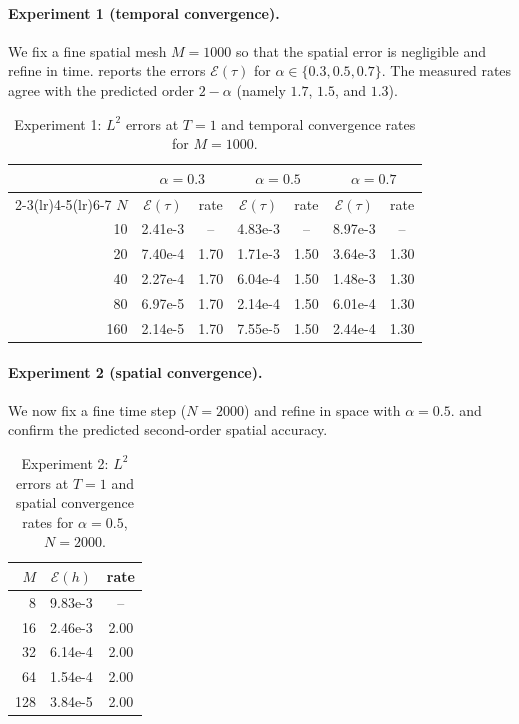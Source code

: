 \documentclass[11pt]{ajam}
\begin{document}
\paragraph{Experiment 1 (temporal convergence).}
We fix a fine spatial mesh $M=1000$ so that the spatial error is negligible
and refine in time.  reports the errors $\mathcal{E}(\tau)$
for $\alpha\in\{0.3,0.5,0.7\}$. The measured rates agree with the predicted
order $2-\alpha$ (namely $1.7$, $1.5$, and $1.3$).

\begin{table}[t]
  \centering
  \caption{Experiment 1: $L^2$ errors at $T=1$ and temporal convergence
           rates for $M=1000$.}
  \label{tab:time}
  \small
  \begin{tabular}{@{}r cc cc cc@{}}
    \toprule
    & \multicolumn{2}{c}{$\alpha=0.3$}
    & \multicolumn{2}{c}{$\alpha=0.5$}
    & \multicolumn{2}{c}{$\alpha=0.7$}\\
    \cmidrule(lr){2-3}\cmidrule(lr){4-5}\cmidrule(lr){6-7}
    $N$ & $\mathcal{E}(\tau)$ & rate
        & $\mathcal{E}(\tau)$ & rate
        & $\mathcal{E}(\tau)$ & rate \\
    \midrule
    10  & 2.41e-3 & --   & 4.83e-3 & --   & 8.97e-3 & --   \\
    20  & 7.40e-4 & 1.70 & 1.71e-3 & 1.50 & 3.64e-3 & 1.30 \\
    40  & 2.27e-4 & 1.70 & 6.04e-4 & 1.50 & 1.48e-3 & 1.30 \\
    80  & 6.97e-5 & 1.70 & 2.14e-4 & 1.50 & 6.01e-4 & 1.30 \\
    160 & 2.14e-5 & 1.70 & 7.55e-5 & 1.50 & 2.44e-4 & 1.30 \\
    \bottomrule
  \end{tabular}
\end{table}

\paragraph{Experiment 2 (spatial convergence).}
We now fix a fine time step ($N=2000$) and refine in space with
$\alpha=0.5$.  and  confirm the predicted
second-order spatial accuracy.

\begin{table}[t]
  \centering
  \caption{Experiment 2: $L^2$ errors at $T=1$ and spatial convergence
           rates for $\alpha=0.5$, $N=2000$.}
  \label{tab:space}
  \small
  \begin{tabular}{@{}r cc@{}}
    \toprule
    $M$ & $\mathcal{E}(h)$ & rate \\
    \midrule
    8   & 9.83e-3 & --   \\
    16  & 2.46e-3 & 2.00 \\
    32  & 6.14e-4 & 2.00 \\
    64  & 1.54e-4 & 2.00 \\
    128 & 3.84e-5 & 2.00 \\
    \bottomrule
  \end{tabular}
\end{table}
\end{document}
